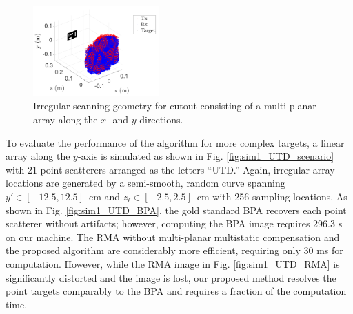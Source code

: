 \documentclass{ieeeaccess}
\begin{document}
\begin{figure}[h]
    \centering
    \includegraphics[width=0.43\textwidth]{smith11.png}
    \caption{Irregular scanning geometry for cutout consisting of a multi-planar array along the $x$- and $y$-directions.}
    \label{fig:sim2_cutout2_scenario}
\end{figure}

To evaluate the performance of the algorithm for more complex targets, a linear array along the $y$-axis is simulated as shown in Fig. \ref{fig:sim1_UTD_scenario} with 21 point scatterers arranged as the letters ``UTD.''
Again, irregular array locations are generated by a semi-smooth, random curve spanning \mbox{$y' \in [-12.5, 12.5]$ cm} and \mbox{$z_\ell \in [-2.5, 2.5]$ cm} with 256 sampling locations.
As shown in Fig. \ref{fig:sim1_UTD_BPA}, the gold standard BPA recovers each point scatterer without artifacts; however, computing the BPA image requires 296.3 s on our machine. 
The RMA without multi-planar multistatic compensation and the proposed algorithm are considerably more efficient, requiring only 30 ms for computation.
However, while the RMA image in Fig. \ref{fig:sim1_UTD_RMA} is significantly distorted and the image is lost, our proposed method resolves the point targets comparably to the BPA and requires a fraction of the computation time.
\end{document}
